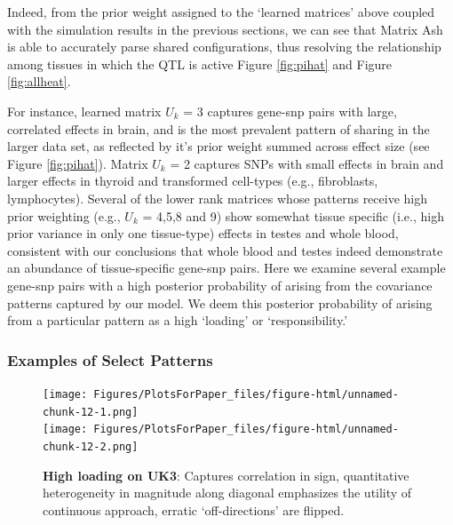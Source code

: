  
Indeed, from the prior weight assigned to the `learned matrices' above coupled with the simulation results in the previous sections, we can see that Matrix Ash is able to accurately parse shared configurations, thus resolving the relationship among tissues in which the QTL is active Figure \ref{fig:pihat} and Figure \ref{fig:allheat}. 

For instance, learned matrix $U_{k}$ = 3 captures gene-snp pairs with large, correlated effects in brain, and is the most prevalent pattern of sharing in the larger data set, as reflected by it's prior weight summed across effect size (see Figure \ref{fig:pihat}). Matrix $U_{k}$ = 2 captures SNPs with small effects in brain and larger effects in thyroid and transformed cell-types (e.g., fibroblasts, lymphocytes). Several of the lower rank matrices whose patterns receive high prior weighting (e.g., $U_{k}$ = 4,5,8 and 9) show somewhat tissue specific (i.e., high prior variance in only one tissue-type) effects in testes and whole blood, consistent with our conclusions that whole blood and testes indeed demonstrate an abundance of tissue-specific gene-snp pairs. Here we examine several example gene-snp pairs with a high posterior probability of arising from the covariance patterns captured by our model. We deem this posterior probability of arising from a particular pattern as a high `loading' or `responsibility.' 


\subsubsection{Examples of Select Patterns}

\begin{figure}[htbp]
\texttt{[image: Figures/PlotsForPaper\_files/figure-html/unnamed-chunk-12-1.png]}\\
\texttt{[image: Figures/PlotsForPaper\_files/figure-html/unnamed-chunk-12-2.png]}
\caption{\textbf{High loading on UK3}: Captures correlation in sign, quantitative heterogeneity in magnitude along diagonal emphasizes the utility of continuous approach, erratic `off-directions' are flipped.}
\label{fig:uk3}
\end{figure}


